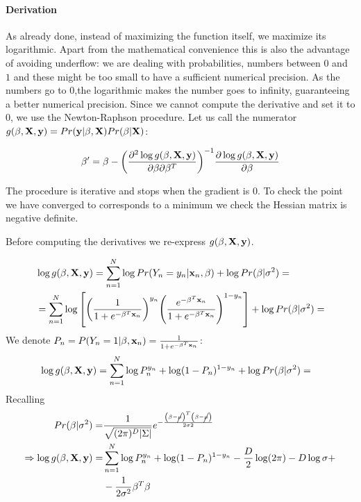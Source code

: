 \paragraph{Derivation}
As already done, instead of maximizing the function itself, we maximize its logarithmic. Apart from the mathematical convenience this is also the advantage of avoiding underflow: we are dealing with probabilities, numbers between $0$ and $1$ and these might be too small to have a sufficient numerical precision. As the numbers go to $0$,the logarithmic makes the number goes to infinity, guaranteeing a better numerical precision.
 Since we cannot compute the derivative and set it to $0$, we use the Newton-Raphson procedure. Let us call the numerator $g(\mathbf{\beta},\mathrm{\mathbf{X}},\mathbf{y}) = Pr(\mathbf{y}|\mathbf{\beta},\mathrm{\mathbf{X}})Pr(\mathbf{\beta}|\mathrm{\mathbf{X}})$:

\begin{equation}
\be' = \be - \br{\frac{\partial^2\log g(\be,\X,\y)}{\partial \be \partial \be^T}}^{-1} \frac{\partial \log g(\be,\X,\y)}{\partial \be}
\end{equation}

The procedure is iterative and stops when the gradient is $0$. To check the point we have converged to corresponds to a minimum we check the Hessian matrix is negative definite.

Before computing the derivatives we re-express $g(\mathbf{\beta},\mathrm{\mathbf{X}},\mathbf{y})$.

\begin{equation}
\begin{aligned}
&\log g(\be,\X,\y) = \sum_{n=1}^N \log Pr(Y_n=y_n|\x_n, \be) + \log Pr(\be|\sigma^2) = \\
&=  \sum_{n=1}^N \log \left[\br{\frac{1}{1+e^{-\be^T\x_n}}}^{y_n} \br{\frac{e^{-\be^T\x_n}}{1+e^{-\be^T\x_n}}}^{1-y_n}\right] + \log Pr(\be|\sigma^2) =
\end{aligned}
\end{equation}
We denote $P_n=P(Y_n=1|\mathbf{\beta}, \mathbf{x}_n) = \frac{1}{1+e^{-\mathbf{\beta}^T\mathbf{x}_n}}$:
\begin{equation}
\begin{aligned}
&\log g(\mathbf{\beta},\mathrm{\mathbf{X}},\mathbf{y}) =  \sum_{n=1}^N \log P_n^{y_n} +\log(1-P_n)^{1-y_n}+ \log Pr(\mathbf{\beta}|\sigma^2) =
\end{aligned}
\end{equation}
Recalling
\begin{equation}
\begin{aligned}
Pr(\mathbf{\beta}|\sigma^2)  =& \frac{1}{\sqrt{(2\pi)^D|\Sigma|}} e^{-\frac{\left(\mathbf{\beta}-\cancel{\mu}\right)^T\left(\mathbf{\beta}-\cancel{\mu}\right)}{2\sigma2}}\\
\Rightarrow\log g(\mathbf{\beta},\mathrm{\mathbf{X}},\mathbf{y}) =&  \sum_{n=1}^N \log P_n^{y_n} +\log(1-P_n)^{1-y_n} -\frac{D}{2}\log(2\pi) - D\log\sigma +\\
&- \frac{1}{2\sigma^2} \mathbf{\beta}^T\mathbf{\beta}
\end{aligned}
\end{equation}

